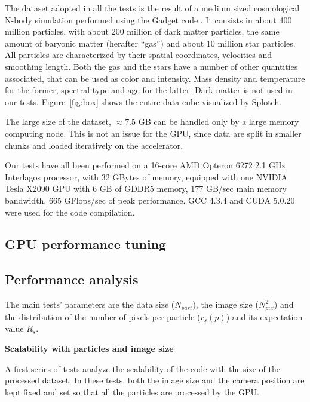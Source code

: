 \documentclass[11pt]{article}
\begin{document}
The dataset adopted in all the tests is the result of a medium sized cosmological 
N-body simulation performed using the Gadget code \cite{gadgeturl}. It consists in about 
400 million particles, with about 200 million of dark matter particles, the same amount 
of baryonic matter (herafter ``gas'') and about 10 million star particles. 
All particles are characterized by their spatial coordinates, velocities
and smoothing length. 
Both the gas and the stars have a number of other quantities associated, that can be used 
as color and intensity. Mass density and temperature for the former, spectral type and age
for the latter. Dark matter is not used in our tests. Figure~\ref{fig:box} shows 
the entire data cube visualized by Splotch.

The large size of the dataset, $\approx 7.5$ GB can be handled only by a large memory computing node. 
This is not an issue for the GPU, since data are split 
in smaller chunks and loaded iteratively on the accelerator. 

Our tests have all been performed on a 16-core AMD Opteron 6272 2.1 GHz Interlagos processor,
with 32 GBytes of memory, equipped with one NVIDIA Tesla X2090 GPU with 6 GB of GDDR5 memory,
177 GB/sec 
main memory bandwidth, 665 GFlops/sec of peak performance. GCC 4.3.4 and CUDA 5.0.20 
were used for the code compilation.

\subsection{GPU performance tuning}
\label{sec:gpuperf}


\subsection{Performance analysis}
\label{sec:performance}

The main tests' parameters are the data size ($N_{part}$),
the image size ($N_{pix}^2$) and the distribution of the number of pixels 
per particle ($r_s(p)$) and its expectation value $R_s$.

\medskip
\noindent 
{\bf Scalability with particles and image size}

A first series of tests analyze the scalability of the code
with the size of the processed dataset. In these tests, both the image size
and the camera position are kept fixed and set so that all the particles are processed 
by the GPU.
\end{document}
